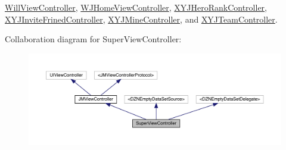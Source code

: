 \mbox{\hyperlink{interface_will_view_controller}{Will\+View\+Controller}}, \mbox{\hyperlink{interface_w_j_home_view_controller}{W\+J\+Home\+View\+Controller}}, \mbox{\hyperlink{interface_x_y_j_hero_rank_controller}{X\+Y\+J\+Hero\+Rank\+Controller}}, \mbox{\hyperlink{interface_x_y_j_invite_frined_controller}{X\+Y\+J\+Invite\+Frined\+Controller}}, \mbox{\hyperlink{interface_x_y_j_mine_controller}{X\+Y\+J\+Mine\+Controller}}, and \mbox{\hyperlink{interface_x_y_j_team_controller}{X\+Y\+J\+Team\+Controller}}.



Collaboration diagram for Super\+View\+Controller\+:\nopagebreak
\begin{figure}[H]
\begin{center}
\leavevmode
\includegraphics[width=350pt]{interface_super_view_controller__coll__graph}
\end{center}
\end{figure}
